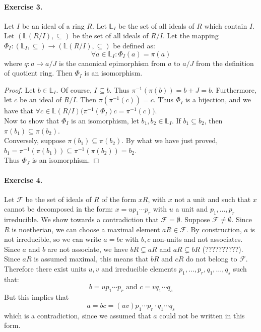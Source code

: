 \documentclass[12pt,a4paper]{report}
\theoremstyle{definition}
\theoremstyle{num.custom-title}
\begin{document}
\paragraph{Exercise 3.} Let $I$ be an ideal of a ring $R$. Let $\mathbb L_I$ be the set of all ideals of $R$ which contain $I$. Let $\left({\mathbb L \left({R / I}\right), \subseteq}\right)$ be the set of all ideals of $R / I$. Let the mapping $\Phi_I: \left({\mathbb L_I, \subseteq}\right) \to \left({\mathbb L \left({R / I}\right), \subseteq}\right)$ be defined as:
\[
\forall a \in \mathbb L_I: \Phi_I \left({a}\right) = \pi\left({a}\right)
\]
where $q: a \to a / J$ is the canonical epimorphism from $a$ to $a / J$ from the definition of quotient ring.
Then $\Phi_I$ is an isomorphism.
\begin{proof}
Let $b \in \mathbb L_I$. Of course, $I \subseteq b$. Thus $\pi^{-1} \left({\pi \left({b}\right)}\right) = b + J = b$. Furthermore, let $c$ be an ideal of $R / I$. Then $\pi \left({\pi^{-1} \left({c}\right)}\right) = c$.
Thus $\Phi_I$ is a bijection, and we have that $\forall c \in \mathbb L \left({R / I}\right) \big( \pi^{-1} \left({\Phi_I}\right) c = \pi^{-1} \left({c}\right) \big)$.\\
Now to show that $\Phi_I$ is an isomorphism, let $b_1, b_2 \in \mathbb L_I$. If $b_1 \subseteq b_2$, then $\pi \left({b_1}\right) \subseteq \pi \left({b_2}\right)$.\\
Conversely, suppose $\pi \left({b_1}\right) \subseteq \pi \left({b_2}\right)$. By what we have just proved, $b_1 = \pi^{-1} \left({\pi \left({b_1}\right)}\right) \subseteq  \pi^{-1} \left({\pi \left({b_2}\right)}\right) = b_2$.\\
Thus $\Phi_J$ is an isomorphism.
\end{proof}

\paragraph{Exercise 4.}
Let $\mathcal F$ be the set of ideals of $R$ of the form $xR$, with $x$ not a unit and such that $x$ cannot be decomposed in the form: $x = u p_1 \cdots p_r$
with $u$ a unit and $p_1,\ldots,p_r$ irreducible. We show towards a contradiction that $\mathcal F = \emptyset$. Suppose $\mathcal F \neq \emptyset$. Since $R$ is noetherian, we can choose a maximal element $a R \in \mathcal F$. By construction, $a$ is not irreducible, so we can write $a = bc$ with $b,c$ non-units and not associates. Since $a$ and $b$ are not associate, we have $bR \subsetneq aR$ and $aR \subsetneq bR$ (??????????). Since $aR$ is assumed maximal, this means that $bR$ and $cR$ do not belong to $\mathcal F$. Therefore there exist units $u,v$ and irreducible elements $p_1,\ldots,p_r,q_1,\ldots,q_s$ such that:
\[
b = u p_1 \cdots p_r \text{ and } c = v q_1 \cdots q_s
\]
But this implies that
\[a = bc = \left({ uv }\right) p_1 \cdots p_r \cdot q_1 \cdots q_s
\]
which is a contradiction, since we assumed that $a$ could not be written in this form.
\end{document}
